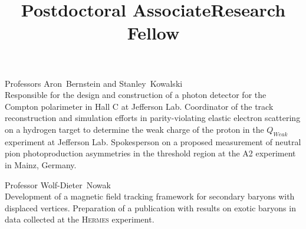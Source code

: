 \documentclass[overlapped,line,final,11pt,letterpaper]{res}
\begin{document}
\begin{resume}
\title{Postdoctoral Associate}
\begin{position}
  Professors Aron~Bernstein and Stanley~Kowalski
  \\
  Responsible for the design and construction of a photon detector for the Compton polarimeter in Hall C at Jefferson Lab.  Coordinator of the track reconstruction and simulation efforts in parity-violating elastic electron scattering on a hydrogen target to determine the weak charge of the proton in the $Q_{Weak}$ experiment at Jefferson Lab.  Spokesperson on a proposed measurement of neutral pion photoproduction asymmetries in the threshold region at the A2 experiment in Mainz, Germany.
\end{position}

\title{Research Fellow}
\begin{position}
  Professor Wolf-Dieter~Nowak
  \\
  Development of a magnetic field tracking framework for secondary baryons with displaced vertices.  Preparation of a publication with results on exotic baryons in data collected at the \textsc{Hermes} experiment.
\end{position}


\begin{itemize}

\end{itemize}
\end{resume}
\end{document}
